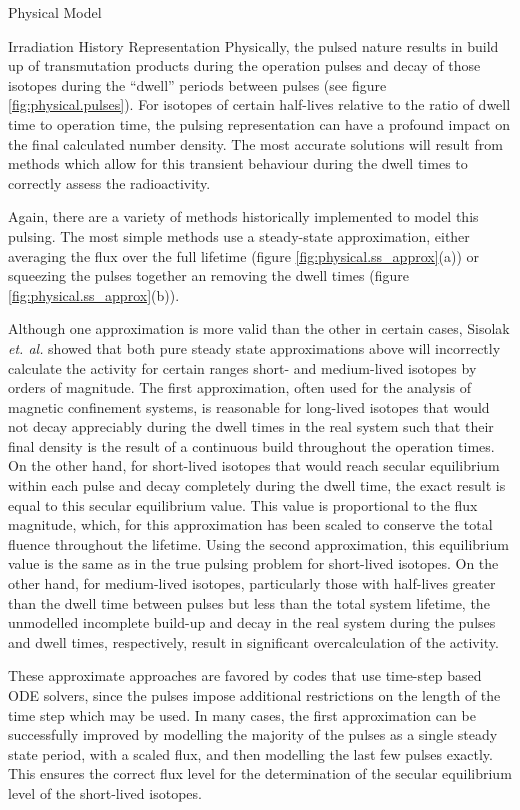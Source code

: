 \begin{chapter}{Physical Model\label{chap:physical}}
\begin{section}{Irradiation History Representation}
  Physically, the pulsed nature results in build up of transmutation
  products during the operation pulses and decay of those isotopes
  during the ``dwell'' periods between pulses (see figure
  \ref{fig:physical.pulses}).  For isotopes of certain half-lives
  relative to the ratio of dwell time to operation time, the pulsing
  representation can have a profound impact on the final calculated
  number density.  The most accurate solutions will result from
  methods which allow for this transient behaviour during the dwell
  times to correctly assess the radioactivity.
  
  Again, there are a variety of methods historically implemented to
  model this pulsing.  The most simple methods use a steady-state
  approximation, either averaging the flux over the full lifetime
  (figure \ref{fig:physical.ss_approx}(a)) or squeezing the pulses
  together an removing the dwell times (figure
  \ref{fig:physical.ss_approx}(b)).
  
  Although one approximation is more valid than the other in certain
  cases, Sisolak {\em et. al.}\cite{bib:PULSAR} showed that both pure
  steady state approximations above will incorrectly calculate the
  activity for certain ranges short- and medium-lived isotopes by
  orders of magnitude.  The first approximation, often used for the
  analysis of magnetic confinement systems, is reasonable for
  long-lived isotopes that would not decay appreciably during the
  dwell times in the real system such that their final density is the
  result of a continuous build throughout the operation times.  On the
  other hand, for short-lived isotopes that would reach secular
  equilibrium within each pulse and decay completely during the dwell
  time, the exact result is equal to this secular equilibrium value.
  This value is proportional to the flux magnitude, which, for this
  approximation has been scaled to conserve the total fluence
  throughout the lifetime.  Using the second approximation, this
  equilibrium value is the same as in the true pulsing problem for
  short-lived isotopes.  On the other hand, for medium-lived isotopes,
  particularly those with half-lives greater than the dwell time
  between pulses but less than the total system lifetime, the
  unmodelled incomplete build-up and decay in the real system during
  the pulses and dwell times, respectively, result in significant
  overcalculation of the activity.

  These approximate approaches are favored by codes that use time-step
  based ODE solvers, since the pulses impose additional restrictions
  on the length of the time step which may be used.  In many cases,
  the first approximation can be successfully improved by modelling
  the majority of the pulses as a single steady state period, with a
  scaled flux, and then modelling the last few pulses exactly.  This
  ensures the correct flux level for the determination of the secular
  equilibrium level of the short-lived isotopes.
  

\end{section}
\end{chapter}

